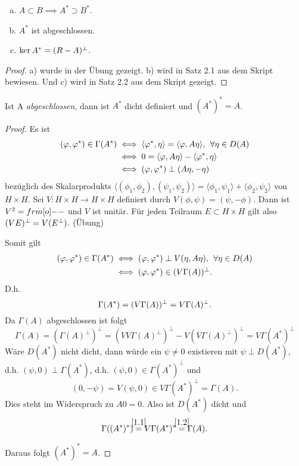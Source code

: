 \documentclass{mycourse}
\begin{document}
\begin{st}\label{1.8}
\begin{enumerate}[a)]
\item $A\subset B \implies A^*\supset B^*$.
\item $A^*$ ist abgeschlossen.
\item $\ker A^*=(R-A)^\perp$. 
\end{enumerate}
\end{st}
\begin{proof}
a) wurde in der Übung gezeigt. b) wird in Satz 2.1 aus dem Skript bewiesen. Und c) wird in Satz 2.2 aus dem Skript gezeigt.
\end{proof}
\begin{st}\label{1.9}
Ist A \emph{abgeschlossen}, dann ist $A^*$ dicht definiert und $(A^*)^*=A$.
\end{st}
\begin{proof}
Es ist
\begin{align*}
(\phi, \phi^*)\in \Gamma(A^*) &\iff \langle \phi^*, \eta\rangle = \langle \phi, A\eta\rangle, \, \forall \eta\in D(A)\\ &\iff 0=\langle \phi, A\eta\rangle - \langle \phi^*, \eta\rangle \\ &\iff (\phi, \phi^*) \orth (A\eta, - \eta)
\end{align*}
bezüglich des Skalarprodukts $\langle (\phi_1, \phi_2), (\psi_1, \psi_2)\rangle=\langle \phi_1, \psi_1\rangle + \langle \phi_2, \psi_2\rangle$ von $H\times H$. Sei $V:H\times H \to H \times H$ definiert durch $V(\phi, \psi)=(\psi, -\phi)$. Dann ist $V^2=\1$ und $V$ ist unitär. Für jeden Teilraum $E\subset H\times H$ gilt also $(VE)^\perp = V(E^\perp)$. (Übung)

Somit gilt
\begin{align*}
(\phi, \phi^*) \in \Gamma(A^*) &\iff (\phi, \phi^*) \orth V(\eta, A\eta), \, \forall \eta\in D(A)\\
&\iff (\phi, \phi^*)\in (V\Gamma(A))^\orth.
\end{align*}
D.h. 
\begin{equation}\label{1.1}
\Gamma(A^*)=(V\Gamma(A))^\perp=V\Gamma(A)^\perp.
\end{equation}
Da $\Gamma(A)$ abgeschlossen ist folgt 
\begin{equation}\label{1.2}
\Gamma(A) = ( \Gamma(A)^\perp)^\perp = (VV \Gamma(A)^\perp)^\perp - V(V\Gamma(A)^\perp)^\perp = V \Gamma(A^*)^\perp
\end{equation}
Wäre $D(A^*)$ nicht dicht, dann würde ein $\psi \neq 0$ existieren mit $\psi \perp D(A^*)$, d.h. $(\psi,0) \perp \Gamma(A^*)$, d.h. $(\psi,0) \in \Gamma(A^*)^\perp$ und 
\[
(0,-\psi)=V(\psi, 0) \in V \Gamma(A^*)^\perp= \Gamma(A). 
\]
Dies steht im Widerspruch zu $A0=0$. Also ist $D(A^*)$ dicht und
\[
\Gamma((A^*)^*)\stack{\eqref{1.1}}= V \Gamma(A^*)^* \stack{\eqref{1.2}}= \Gamma(A).
\]
Daraus folgt $(A^*)^*=A$.
\end{proof}
\end{document}
